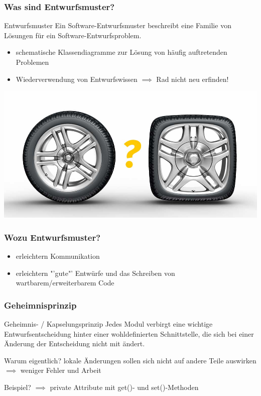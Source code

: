 \documentclass[18pt]{beamer}
\begin{document}
	\begin{frame}
		\frametitle{Was sind Entwurfsmuster?}
		\begin{block}{Entwurfsmuster}
			Ein Software-Entwurfsmuster beschreibt eine
			Familie von Lösungen für ein Software-Entwurfsproblem.
		\end{block}
		\pause
		\begin{itemize}
			\item schematische Klassendiagramme zur Lösung von häufig auftretenden Problemen \pause
			\item Wiederverwendung von Entwurfswissen $\implies$ Rad nicht neu erfinden!
		\end{itemize}
		\pause
		\centering
		\includegraphics[scale=0.2]{./pics/tut3/new-wheel.jpg}
	\end{frame}

	\begin{frame}
		\frametitle{Wozu Entwurfsmuster?}
		\begin{itemize}
			\item erleichtern Kommunikation \pause
			\item erleichtern "'gute"' Entwürfe und das Schreiben von wartbarem/erweiterbarem Code
		\end{itemize}
\end{frame}
	
	\begin{frame}
		\frametitle{Geheimnisprinzip}
		\begin{block}{Geheimnis- / 
				Kapselungsprinzip}
			Jedes Modul verbirgt eine wichtige
			Entwurfsentscheidung hinter einer
			wohldefinierten Schnittstelle, die sich bei einer
			Änderung der Entscheidung nicht mit ändert.
		\end{block}
		\pause
		\begin{alertblock}{Warum eigentlich?}
			lokale Änderungen sollen sich nicht auf andere Teile auswirken 
			\linebreak $\implies$ weniger Fehler und Arbeit
		\end{alertblock}
		Beispiel? \pause $\implies$ private Attribute mit get()- und set()-Methoden
	\end{frame}
\end{document}
